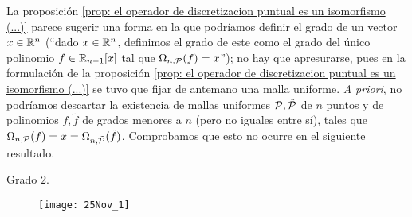 La proposición
\ref{prop: el operador de discretizacion puntual es un isomorfismo (...)}
parece sugerir 
una forma en la que podríamos 
definir el grado de 
un vector $x \in \mathbb{R}^{n}$ (``dado $x \in \mathbb{R}^{n}$, definimos
el grado de este como el grado del único polinomio $f \in \mathbb{R}_{n-1}[x]$
tal que $\Omega_{n, \mathcal{P}}(f)=x$''); no hay
que apresurarse, pues en la formulación de
la proposición
\ref{prop: el operador de discretizacion puntual es un isomorfismo (...)}
se tuvo que fijar de antemano una malla uniforme.
\textit{A priori}, no podríamos descartar 
la existencia de mallas uniformes
$\mathcal{P}, \tilde{\mathcal{P}}$ 
de $n$ puntos
y de polinomios
$f, \tilde{f}$ de grados menores a $n$ (pero no 
iguales entre sí), tales que
$\Omega_{n, \mathcal{P}}(f) = x = \Omega_{n, \tilde{\mathcal{P}}}(\tilde{f})$.
Comprobamos que esto no ocurre
en el siguiente resultado.


Grado $2$.

\begin{figure}[H]
	\centering
	\texttt{[image: 25Nov\_1]} 
\end{figure}	


